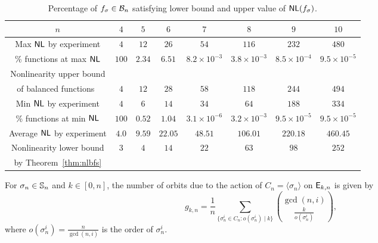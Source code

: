 \documentclass{llncs}
\begin{document}
\begin{table}[h!]
\centering
\begin{tabular}{|c|c|c|c||c|c|c|c|}\hline
$n$ & $4$ & $5$ & $6$ & $7$ & $8$ & $9$ & $10$\\ \hline\hline
Max $\mathsf{NL}$ by experiment & $4$ & $12$ & $26$ & $54$ & $116$ & $232$ & $480$\\ \hline
\% functions at max $\mathsf{NL}$ & $100$ & $2.34$ & $6.51$ & $8.2 \times 10^{-3}$ & $3.8 \times 10^{-3}$ & $8.5 \times 10^{-4}$ & $9.5 \times 10^{-5}$\\ \hline
Nonlinearity upper bound & & & & & & &\\
of balanced functions~\cite{SZZ95} & $4$ & $12$ & $28$ & $58$ & $118$ & $244$ & $494$\\ \hline
Min $\mathsf{NL}$ by experiment & $4$ & $6$ & $14$ & $34$ & $64$ & $188$ & $334$\\ \hline
\% functions at min $\mathsf{NL}$ & $100$ & $0.52$ & $1.04$ & $3.1 \times 10^{-6}$ & $3.2 \times 10^{-3}$ & $9.5 \times 10^{-5}$ & $9.5 \times 10^{-5}$\\ \hline
Average $\mathsf{NL}$ by experiment & $4.0$ & $9.59$ & $22.05$ & $48.51$ & $106.01$  & $220.18$ & $460.45$\\ \hline
Nonlinearity lower bound & $3$ & $4$ & $14$ & $22$ & $63$ & $98$ & $252$\\
by Theorem~\ref{thm:nlbfs} & & & & & & &\\ \hline
\end{tabular}
\caption{Percentage of $f_\sigma \in \mathcal{B}_n$ satisfying lower bound and upper value of $\mathsf{NL}(f_\sigma)$.\label{tab:NLminmaxsigma}}
\end{table}
\begin{theorem}\label{thm:resorb}
For $\sigma_n \in \mathbb{S}_n$ and $k \in [0,n]$, the number of orbits due to the action of $C_n = \langle\sigma_n\rangle$ on $\mathsf{E}_{k,n}$ is given by
$$g_{k,n}= \frac{1}{n} \sum\limits_{\{\sigma_n^i \in C_n : o(\sigma_n^i) \mid k \}} {\gcd(n,i)  \choose \frac{k}{o(\sigma_n^i)}},$$
where $o(\sigma_n^i) = \frac{n}{\gcd(n,i)}$ is the order of $\sigma_n^i$. 
\end{theorem}
\end{document}
